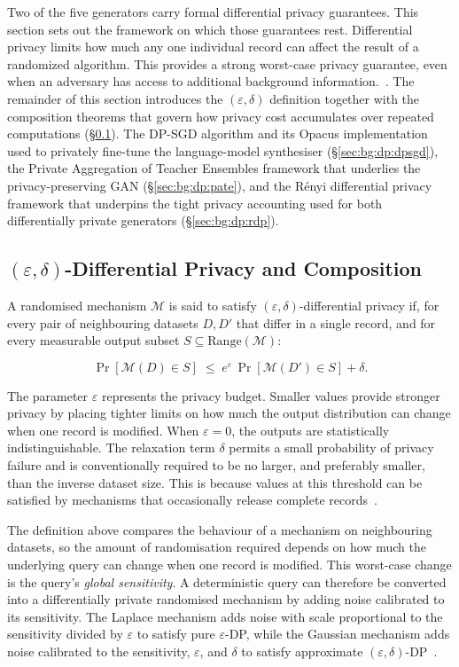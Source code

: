 Two of the five generators carry formal differential
privacy guarantees. This section sets out the framework on which those
guarantees rest. Differential privacy limits how much any one individual 
record can affect the result of a randomized algorithm. This provides a 
strong worst-case privacy guarantee, even when an adversary has access 
to additional background information.~\cite{Dwork2014Foundations}. 
The remainder of this section introduces the $(\varepsilon, \delta)$ definition
together with the composition theorems that govern how privacy cost
accumulates over repeated computations (§\ref{sec:bg:dp:def}). The DP-SGD
algorithm and its Opacus implementation used to privately fine-tune the
language-model synthesiser (§\ref{sec:bg:dp:dpsgd}), the Private Aggregation
of Teacher Ensembles framework that underlies the privacy-preserving GAN
(§\ref{sec:bg:dp:pate}), and the Rényi differential privacy framework that
underpins the tight privacy accounting used for both differentially private
generators (§\ref{sec:bg:dp:rdp}).

\subsection{$(\varepsilon,\delta)$-Differential Privacy and Composition}
\label{sec:bg:dp:def}

A randomised mechanism $\mathcal{M}$ is said to satisfy
$(\varepsilon, \delta)$-differential privacy if, for every pair of neighbouring
datasets $D, D'$ that differ in a single record, and for every measurable
output subset $S \subseteq \mathrm{Range}(\mathcal{M})$:

\begin{equation}
\label{eq:bg:dp:def}
\Pr[\mathcal{M}(D) \in S] \;\le\; e^{\varepsilon}\,\Pr[\mathcal{M}(D') \in S] + \delta.
\end{equation}

The parameter $\varepsilon$ represents the privacy budget. Smaller values 
provide stronger privacy by placing tighter limits on how much the output 
distribution can change when one record is modified. When $\varepsilon = 0$, 
the outputs are statistically indistinguishable. The
relaxation term $\delta$ permits a small probability of privacy failure
and is conventionally required to be no larger, and preferably smaller, than the inverse dataset
size. This is because values at this threshold can be
satisfied by mechanisms that occasionally release complete
records~\cite{Dwork2014Foundations}.

The definition above compares the behaviour of a mechanism on neighbouring
datasets, so the amount of randomisation required depends on how much the
underlying query can change when one record is modified. This worst-case change
is the query's \emph{global sensitivity}. A deterministic query can therefore
be converted into a differentially private randomised mechanism by adding noise
calibrated to its sensitivity. The Laplace mechanism adds noise with scale
proportional to the sensitivity divided by $\varepsilon$ to satisfy pure
$\varepsilon$-DP, while the Gaussian mechanism adds noise calibrated to the
sensitivity, $\varepsilon$, and $\delta$ to satisfy approximate
$(\varepsilon,\delta)$-DP~\cite{Dwork2006DP,Dwork2014Foundations}.

